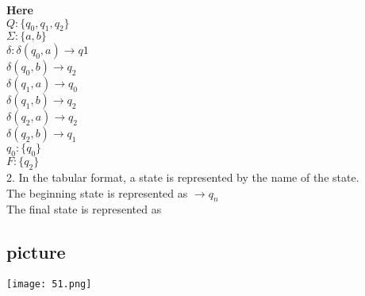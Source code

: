 \documentclass{article}
\begin{document}
\vspace*{0.2cm}
\textbf{Here}\\
\hspace*{1.5cm} $Q : \{q_{0}, q_{1}, q_{2}\}$ \\
\hspace*{1.5cm} $\Sigma : \{a, b\}$ \\
\hspace*{1.5cm} $\delta : \delta(q_{0}, a) \rightarrow q1$ \\
\hspace*{2cm} $\delta(q_{0}, b) \rightarrow q_{2}$ \\
\hspace*{2cm} $\delta(q_{1}, a) \rightarrow q_{0}$ \\
\hspace*{2cm} $\delta(q_{1}, b) \rightarrow q_{2}$ \\
\hspace*{2cm} $\delta(q_{2}, a) \rightarrow q_{2}$ \\
\hspace*{2cm} $\delta(q_{2}, b) \rightarrow q_{1}$ \\
\hspace*{1.5cm} $q_{0} : \{q_{0}\}$ \\
\hspace*{1.5cm} $F : \{q_{2}\}$ \\

\vspace*{0.2cm}
2. In the tabular format, a state is represented by the name of the state.\\
The beginning state is represented as $\rightarrow q_{n}$ \\

\hspace*{0.4cm} The final state is represented as

\vspace*{0.3cm}
\begin{center}
\section{picture}
\texttt{[image: 51.png]}
\end{center}
\end{document}
